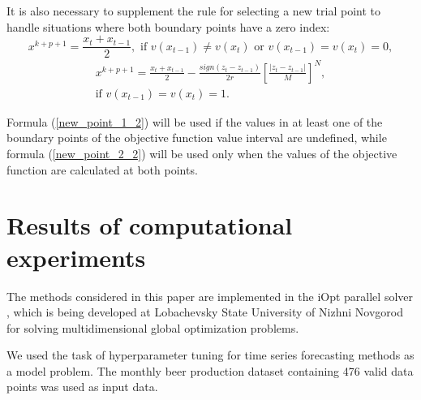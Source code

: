 \documentclass[runningheads]{llncs}
\begin{document}
It is also necessary to supplement the rule for selecting a new trial point to handle situations where both boundary points have a zero index:
\begin{equation}\label{new_point_1_2} 
x^{k+p+1} = \frac{x_t+x_{t-1}}{2}, \text{ if } v(x_{t-1}) \neq v(x_t) \text{ or } v(x_{t-1})=v(x_t)=0,
\end{equation}
\begin{equation}\label{new_point_2_2} 
\begin{split}
x^{k+p+1} = \frac{x_t+x_{t-1}}{2}-\frac{\textit{sign}{(z_t-z_{t-1})}}{2r} \left[ \frac{|z_t-z_{t-1}|}{M} \right]^N, \\
\text{if }  v(x_{t-1})=v(x_t) = 1.
\end{split}
\end{equation}


Formula (\ref{new_point_1_2}) will be used if the values in at least one of the boundary points of the objective function value interval are undefined, while formula (\ref{new_point_2_2}) will be used only when the values of the objective function are calculated at both points.

\section{Results of computational experiments}\label{sec:RCE}

The methods considered in this paper are implemented in the iOpt parallel solver \cite{iOptURL}, which is being developed at Lobachevsky State University of Nizhni Novgorod  for solving multidimensional global optimization problems.

We used the task of hyperparameter tuning for time series forecasting methods as a model problem. The monthly beer production dataset \cite{MonthlyBeerDataset,MonthlyBeerArticle} containing 476 valid data points was used as input data. 
\end{document}
